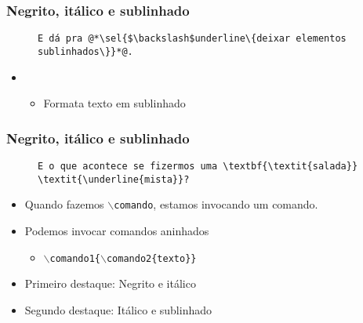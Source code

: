 \begin{frame}[fragile] \frametitle{Negrito, itálico e sublinhado}
\begin{figure}[!t]
\begin{lstlisting}
E dá pra @*\sel{$\backslash$underline\{deixar elementos sublinhados\}}*@.
\end{lstlisting}
\end{figure}

\begin{itemize}
	\item {}
	\begin{itemize}
		\item Formata texto em sublinhado
	\end{itemize}
\end{itemize}
\end{frame}

\begin{frame}[fragile] \frametitle{Negrito, itálico e sublinhado}
\begin{figure}[!t]
\begin{lstlisting}
E o que acontece se fizermos uma \textbf{\textit{salada}} \textit{\underline{mista}}?
\end{lstlisting}
\end{figure}

\begin{itemize}
	\item Quando fazemos $\backslash$\texttt{comando}, estamos invocando um comando.
	\item Podemos invocar comandos aninhados
	\begin{itemize}
		\item \texttt{$\backslash$comando1\{$\backslash$comando2\{texto\}\}}
	\end{itemize}
	\item Primeiro destaque: Negrito e itálico
	\item Segundo destaque: Itálico e sublinhado
\end{itemize}
\end{frame}